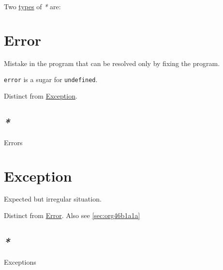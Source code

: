 \documentclass[a4paper,14pt,oneside]{book}
\begin{document}
Two \hyperref[orga3bdd72]{types} of \emph{*} are:

\chapter{\label{orge4c00b0}Error}
\label{sec:orgce606e5}
Mistake in the program that can be resolved only by fixing the program.

\texttt{error} is a sugar for \texttt{undefined}.

Distinct from \hyperref[org2a8d010]{Exception}.

\section{\emph{*}}
\label{sec:orgb6ff2ea}

\label{org4b8da74}Errors

\chapter{\label{org2a8d010}Exception}
\label{sec:orgd7dcba6}
Expected but irregular situation.

Distinct from \hyperref[orge4c00b0]{Error}. Also see \ref{sec:org46b1a1a}

\section{\emph{*}}
\label{sec:org749ec5b}

\label{orgfdcf1c2}Exceptions
\end{document}
